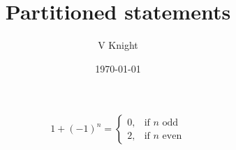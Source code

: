 \documentclass{article}
\title{Partitioned statements}
\author{V Knight}
\date{\today}
\begin{document}
\maketitle

\[
    1 + (-1) ^ n =
        \begin{cases}
            0, & \text{if \(n\) odd}\\
            2, & \text{if \(n\) even}
        \end{cases}
\]
\end{document}
